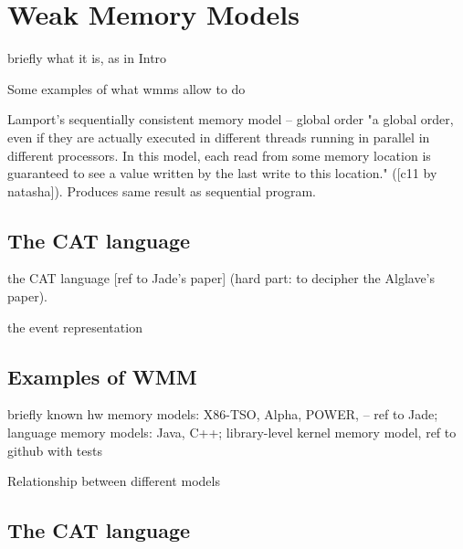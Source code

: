 \chapter{Weak Memory Models}
\label{section:wmm}

briefly what it is, as in Intro

Some examples of what wmms allow to do

Lamport's sequentially consistent memory model -- global order "a global order, even if they are actually executed in different threads running in parallel in different processors. In this model, each read from some memory location is guaranteed to see a value written by the last write to this location." ([c11 by natasha]). Produces same result as sequential program.


\section{The CAT language}

the CAT language [ref to Jade's paper] (hard part: to decipher the Alglave's paper).

the event representation

\section{Examples of WMM}

briefly known hw memory models: X86-TSO, Alpha, POWER, -- ref to Jade;
language memory models: Java, C++;
library-level kernel memory model, ref to github with tests

Relationship between different models %

\section{The CAT language}
\label{section:wmm:cat}
